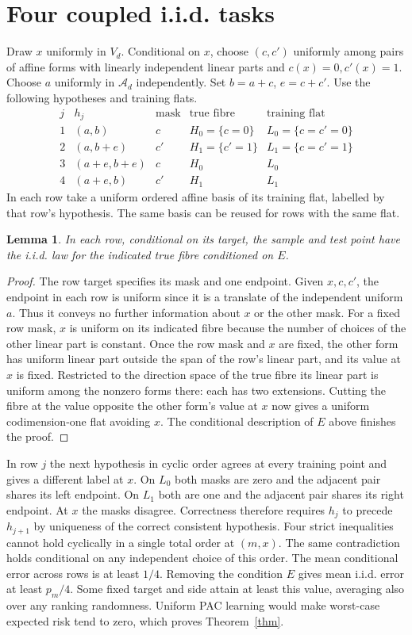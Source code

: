 \documentclass[11pt]{article}
\newtheorem{lemma}[theorem]{Lemma}
\newcommand{\Aff}{\mathcal A}
\begin{document}
\section{Four coupled i.i.d. tasks}
Draw $x$ uniformly in $V_d$. Conditional on $x$, choose $(c,c')$ uniformly among pairs of affine forms with linearly independent linear parts and $c(x)=0,c'(x)=1$. Choose $a$ uniformly in $\Aff_d$ independently. Set $b=a+c$, $e=c+c'$. Use the following hypotheses and training flats.
\[
\begin{array}{c|c|c|c|c}
 j &h_j&\text{mask}&\text{true fibre}&\text{training flat}\\\hline
 1&(a,b)&c&H_0=\{c=0\}&L_0=\{c=c'=0\}\\
 2&(a,b+e)&c'&H_1=\{c'=1\}&L_1=\{c=c'=1\}\\
 3&(a+e,b+e)&c&H_0&L_0\\
 4&(a+e,b)&c'&H_1&L_1
\end{array}
\]
In each row take a uniform ordered affine basis of its training flat, labelled by that row's hypothesis. The same basis can be reused for rows with the same flat.

\begin{lemma}
In each row, conditional on its target, the sample and test point have the i.i.d. law for the indicated true fibre conditioned on $E$.
\end{lemma}
\begin{proof}
The row target specifies its mask and one endpoint. Given $x,c,c'$, the endpoint in each row is uniform since it is a translate of the independent uniform $a$. Thus it conveys no further information about $x$ or the other mask. For a fixed row mask, $x$ is uniform on its indicated fibre because the number of choices of the other linear part is constant. Once the row mask and $x$ are fixed, the other form has uniform linear part outside the span of the row's linear part, and its value at $x$ is fixed. Restricted to the direction space of the true fibre its linear part is uniform among the nonzero forms there: each has two extensions. Cutting the fibre at the value opposite the other form's value at $x$ now gives a uniform codimension-one flat avoiding $x$. The conditional description of $E$ above finishes the proof.
\end{proof}

In row $j$ the next hypothesis in cyclic order agrees at every training point and gives a different label at $x$. On $L_0$ both masks are zero and the adjacent pair shares its left endpoint. On $L_1$ both are one and the adjacent pair shares its right endpoint. At $x$ the masks disagree. Correctness therefore requires $h_j$ to precede $h_{j+1}$ by uniqueness of the correct consistent hypothesis. Four strict inequalities cannot hold cyclically in a single total order at $(m,x)$. The same contradiction holds conditional on any independent choice of this order. The mean conditional error across rows is at least $1/4$. Removing the condition $E$ gives mean i.i.d. error at least $p_m/4$. Some fixed target and side attain at least this value, averaging also over any ranking randomness. Uniform PAC learning would make worst-case expected risk tend to zero, which proves Theorem~\ref{thm}.
\end{document}
